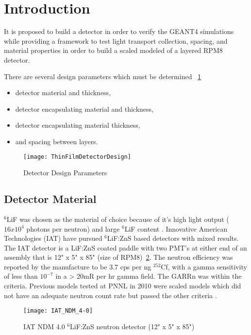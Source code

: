 \section{Introduction}
It is proposed to build a detector in order to verify the GEANT4 simulations while providing a framework to test light transport collection, spacing, and material properties in order to build a scaled modeled of a layered RPM8 detector.

There are several design parameters which must be determined ~\ref{fig:DetectorParameterSchematic}
\begin{itemize}
    \item detector material and thickness,
    \item detector encapsulating material and thickness,
    \item detector encapsulating material thickness,
    \item and spacing between layers.
\end{itemize}
\begin{figure}
    \centering
    \texttt{[image: ThinFilmDetectorDesign]}
    \caption{Detector Design Parameters}
    \label{fig:DetectorParameterSchematic}
\end{figure}

\subsection{Detector Material}
${}^6$LiF was chosen as the material of choice because of it's high light output ($16x10^4$ photons per neutron) and large ${}^{6}$LiF content \cite{carel_w.e_inorganic-scintillator_2001}. 
Innovative American Technologies (IAT) have pursued ${}^6$LiF:ZnS based detectors with mixed results.
The IAT detector is a LiF:ZnS coated paddle with two PMT's at either end of an assembly that is 12" x 5" x 85" (size of RPM8)~\ref{fig:IATPaddle}.
The neutron efficiency was reported by the manufacture to be 3.7 cps per ng ${}^{252}$Cf, with a gamma sensitivity of less than $10^{-7}$ in a > 20mR per hr gamma field.  The GARRn was within the criteria.
Previous models tested at PNNL in 2010 were scaled models which did not have an adequate neutron count rate but passed the other criteria \cite{kouzes_lithium_2010}.
\begin{figure}
    \centering
    \texttt{[image: IAT\_NDM\_4-0]}
    \caption{IAT NDM 4.0 ${}^6$LiF:ZnS neutron detector (12" x 5" x 85")}
    \label{fig:IATPaddle}
\end{figure}

